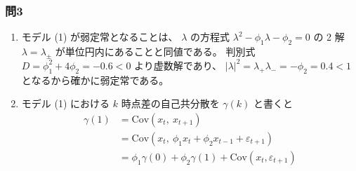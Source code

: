 \documentclass[./main.tex]{subfiles}
\begin{document}
    \subsubsection*{問3}

    \begin{enumerate}
        \item モデル (1) が弱定常となることは、
        $\lambda$ の方程式 $\lambda^2 - \phi_1 \lambda - \phi_2 = 0$ の 2 解 $\lambda = \lambda_{\pm}$ が単位円内にあることと同値である。
        判別式 $D = \phi_1^2 + 4 \phi_2 = - 0.6 < 0$ より虚数解であり、
        $\vert \lambda \vert^2 = \lambda_{+} \lambda_{-} = -\phi_2 = 0.4 < 1$ となるから確かに弱定常である。

        \item モデル (1) における $k$ 時点差の自己共分散を $\gamma (k)$ と書くと
        \begin{align*}
            \gamma (1)
                &= \mathrm{Cov} (x_t, \ x_{t+1})\\
                &= \mathrm{Cov} (x_t, \ \phi_1 x_t + \phi_2 x_{t-1} + \varepsilon_{t+1})\\
                &= \phi_1 \gamma (0) + \phi_2 \gamma (1) + \mathrm{Cov} (x_t, \varepsilon_{t+1})
        \end{align*}
    \end{enumerate}
\end{document}
